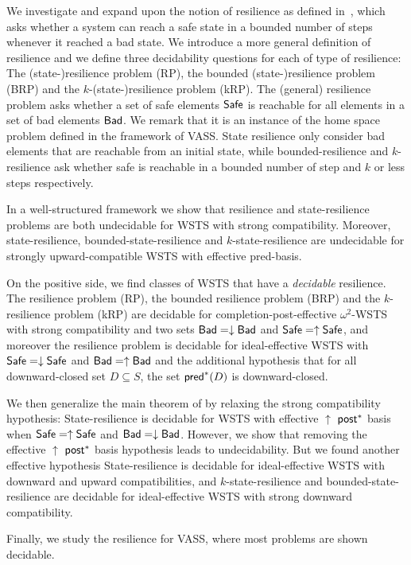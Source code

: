 

We investigate and expand upon the notion of resilience as defined in~\cite{DBLP:journals/corr/PrasadZ16,DBLP:journals/corr/abs-2108-00889,DBLP:conf/gg/Ozkan22}, which asks whether a system can reach a safe state in a bounded number of steps whenever it reached a bad state. We introduce a more general definition of resilience and we define three decidability questions for each of type of resilience: The (state-)resilience problem (RP), the bounded (state-)resilience problem (BRP)
and the $k$-(state-)resilience problem (kRP). The (general) resilience problem 
asks whether a set of safe elements $\textsf{Safe}$ is reachable for all elements in a set of bad elements $\textsf{Bad}$. 
We remark that it is an instance of the home space problem defined in the framework of VASS.
State resilience only consider bad elements that are reachable from an initial state, while bounded-resilience and $k$-resilience ask whether safe is reachable in a bounded number of step and $k$ or less steps respectively.

In a well-structured framework we show that resilience and state-resilience problems are both undecidable for WSTS with strong compatibility. Moreover, state-resilience,
bounded-state-resilience and
 $k$-state-resilience
are undecidable for strongly upward-compatible WSTS with effective pred-basis. 

On the positive side, we find classes of WSTS that have a \emph{decidable} resilience. The resilience problem (RP), the bounded resilience problem (BRP)
and the $k$-resilience problem (kRP) are decidable for completion-post-effective $\omega^2$-WSTS with strong compatibility and two sets $\textsf{Bad} = \downarrow \textsf{Bad}$ and $\textsf{Safe} = \uparrow \textsf{Safe}$, and moreover the resilience problem is decidable for ideal-effective WSTS with 
$\textsf{Safe}=\downarrow \textsf{Safe}$
and $\textsf{Bad}=\uparrow \textsf{Bad}$
and
the additional hypothesis that
for all downward-closed set $D \subseteq S$, the set $\textsf{pred}^*(D)$ is downward-closed.

We then generalize the main theorem of \cite{DBLP:journals/corr/abs-2108-00889,DBLP:conf/gg/Ozkan22} by relaxing the strong compatibility hypothesis: {\sc State-resilience} is decidable for 
 WSTS with effective 
$\uparrow$ $\textsf{post}^*$ basis
when
$\textsf{Safe}=\uparrow \textsf{Safe}$
and $\textsf{Bad}=\downarrow \textsf{Bad}$. However, we show that removing the effective 
$\uparrow$ $\textsf{post}^*$ basis hypothesis leads to undecidability. But we found another effective hypothesis {\sc State-resilience} is decidable for ideal-effective WSTS with downward and upward compatibilities, and {\sc $k$-state-resilience} and {\sc bounded-state-resilience} are decidable for ideal-effective WSTS with strong downward compatibility.

Finally, we study the resilience for VASS, where most problems are shown decidable.






